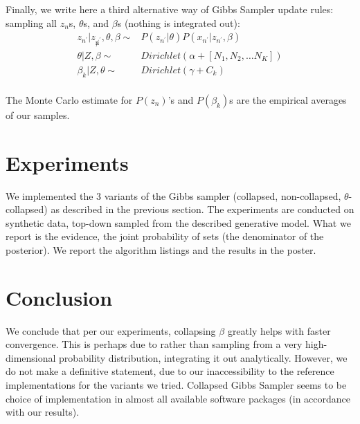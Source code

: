 \documentclass{article}%
\begin{document}
Finally, we write here a third alternative way of Gibbs Sampler update rules: sampling all $z_n$s, $\theta$s, and $\beta$s (nothing is integrated out):
\begin{align*}
z_{n^\prime}|z_{\not n^\prime},\theta,\beta \sim& P(z_{n^\prime}|\theta) P(x_{n^\prime}|z_{n^\prime}, \beta) \\
\theta|Z, \beta \sim& Dirichlet(\alpha + [N_1, N_2, \dots N_K])\\
\beta_k|Z, \theta \sim& Dirichlet(\gamma + C_k)\\
\end{align*}

The Monte Carlo estimate for $P(z_n)$'s and $P(\beta_k)$s are the empirical averages of our samples.

\section{Experiments}
We implemented the 3 variants of the Gibbs sampler (collapsed, non-collapsed, $\theta$-collapsed) as described in the previous section. The experiments are conducted on synthetic data, top-down sampled from the described generative model. What we report is the evidence, the joint probability of sets (the denominator of the posterior). We report the algorithm listings and the results in the poster. 

\section{Conclusion}
We conclude that per our experiments, collapsing $\beta$  greatly helps with faster convergence. This is perhaps due to rather than sampling from a very high-dimensional probability distribution, integrating it out analytically. However, we do not make a definitive statement, due to our inaccessibility to the reference implementations for the variants we tried. Collapsed Gibbs Sampler seems to be choice of implementation in almost all available software packages (in accordance with our results).



\end{document}
